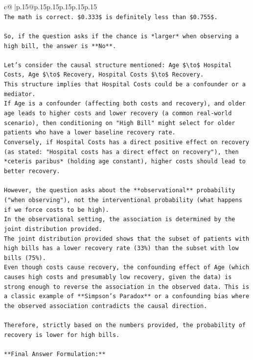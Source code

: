 \documentclass{article}
\begin{document}
{\begin{supertabular}{c@{$\;$}|p{.15\linewidth}@{}p{.15\linewidth}p{.15\linewidth}p{.15\linewidth}p{.15\linewidth}p{.15\linewidth}}
{{{\\ 
\texttt{The math is correct. \$0.333\$ is definitely less than \$0.755\$.} \\
\\ 
\texttt{So, if the question asks if the chance is *larger* when observing a high bill, the answer is **No**.} \\
\\ 
\texttt{Let's consider the causal structure mentioned: Age \$\textbackslash{}to\$ Hospital Costs, Age \$\textbackslash{}to\$ Recovery, Hospital Costs \$\textbackslash{}to\$ Recovery.} \\
\texttt{This structure implies that Hospital Costs could be a confounder or a mediator.} \\
\texttt{If Age is a confounder (affecting both costs and recovery), and older age leads to higher costs and lower recovery (a common real{-}world scenario), then conditioning on "High Bill" might select for older patients who have a lower baseline recovery rate.} \\
\texttt{Conversely, if Hospital Costs has a direct positive effect on recovery (as stated: "Hospital costs has a direct effect on recovery"), then *ceteris paribus* (holding age constant), higher costs should lead to better recovery.} \\
\\ 
\texttt{However, the question asks about the **observational** probability ("when observing"), not the interventional probability (what happens if we force costs to be high).} \\
\texttt{In the observational setting, the association is determined by the joint distribution provided.} \\
\texttt{The joint distribution provided shows that the subset of patients with high bills has a lower recovery rate (33\%) than the subset with low bills (75\%).} \\
\texttt{Even though costs cause recovery, the confounding effect of Age (which causes high costs and presumably low recovery, given the data) is strong enough to reverse the association in the observed data. This is a classic example of **Simpson's Paradox** or a confounding bias where the observed association contradicts the causal direction.} \\
\\ 
\texttt{Therefore, strictly based on the numbers provided, the probability of recovery is lower for high bills.} \\
\\ 
\texttt{**Final Answer Formulation:**} \\
}}}
\end{supertabular}}
\end{document}
